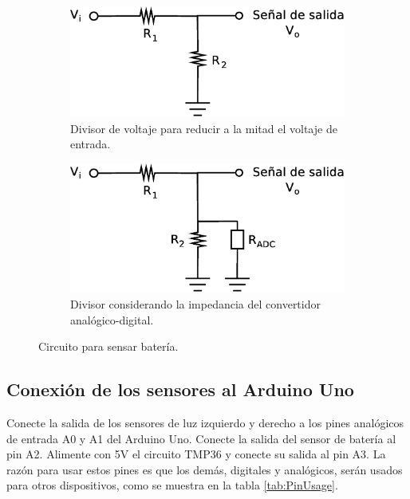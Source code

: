 \documentclass[a4paper,12pt]{article}
\begin{document}
\begin{figure}
  \centering
  \begin{subfigure}[b]{0.43\textwidth}
    \centering
    \includegraphics[width=\textwidth]{Figures/VoltDiv.eps}
    \caption{Divisor de voltaje para reducir a la mitad el voltaje de entrada.}
    \label{fig:VoltDiv}
  \end{subfigure}
  \qquad\qquad
  \begin{subfigure}[b]{0.43\textwidth}
    \centering
    \includegraphics[width=\textwidth]{Figures/VoltDivADC.eps}
    \caption{Divisor considerando la impedancia del convertidor analógico-digital.}
    \label{fig:VoltDivADC}
  \end{subfigure}
\caption{Circuito para sensar batería.}
\end{figure}

\subsection{Conexión de los sensores al Arduino Uno}
Conecte la salida de los sensores de luz izquierdo y derecho a los pines analógicos de entrada A0 y A1 del Arduino Uno.  Conecte la salida del sensor de batería al pin A2. Alimente con 5V el circuito TMP36 y conecte su salida al pin A3. La razón para usar estos pines es que los demás, digitales y analógicos, serán usados para otros dispositivos, como se muestra en la tabla \ref{tab:PinUsage}.
\end{document}
